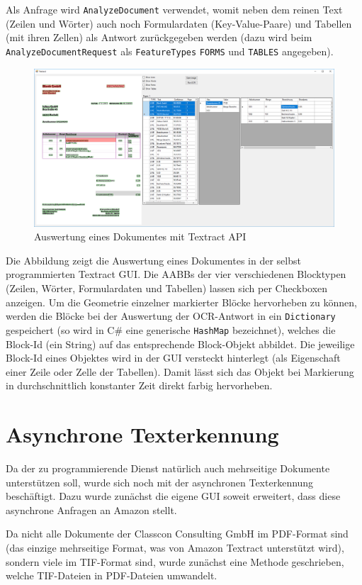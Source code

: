 \documentclass{whswinvcbook}
\begin{document}
Als Anfrage wird \texttt{AnalyzeDocument} verwendet, womit neben dem reinen Text (Zeilen und Wörter) auch noch Formulardaten (Key-Value-Paare) und Tabellen (mit ihren Zellen) als Antwort zurückgegeben werden (dazu wird beim \texttt{AnalyzeDocumentRequest} als \texttt{FeatureTypes} \texttt{FORMS} und \texttt{TABLES} angegeben).
\begin{figure}[H]
    \centering
    \includegraphics[width=1.0\textwidth]{img/textract_gui.png}
    \caption{Auswertung eines Dokumentes mit Textract API}
    \label{fig-textract-gui}
\end{figure}
Die Abbildung zeigt die Auswertung eines Dokumentes in der selbst programmierten Textract GUI. Die AABBs der vier verschiedenen Blocktypen (Zeilen, Wörter, Formulardaten und Tabellen) lassen sich per Checkboxen anzeigen. Um die Geometrie einzelner markierter Blöcke hervorheben zu können, werden die Blöcke bei der Auswertung der OCR-Antwort in ein \texttt{Dictionary} gespeichert (so wird in C\# eine generische \texttt{HashMap} bezeichnet), welches die Block-Id (ein String) auf das entsprechende Block-Objekt abbildet. Die jeweilige Block-Id eines Objektes wird in der GUI versteckt hinterlegt (als Eigenschaft einer Zeile oder Zelle der Tabellen). Damit lässt sich das Objekt bei Markierung in durchschnittlich konstanter Zeit direkt farbig hervorheben.
\section{Asynchrone Texterkennung}
Da der zu programmierende Dienst natürlich auch mehrseitige Dokumente unterstützen soll, wurde sich noch mit der asynchronen Texterkennung beschäftigt. Dazu wurde zunächst die eigene GUI soweit erweitert, dass diese asynchrone Anfragen an Amazon stellt.

Da nicht alle Dokumente der Classcon Consulting GmbH im PDF-Format sind (das einzige mehrseitige Format, was von Amazon Textract unterstützt wird), sondern viele im TIF-Format sind, wurde zunächst eine Methode geschrieben, welche TIF-Dateien in PDF-Dateien umwandelt.
\end{document}
